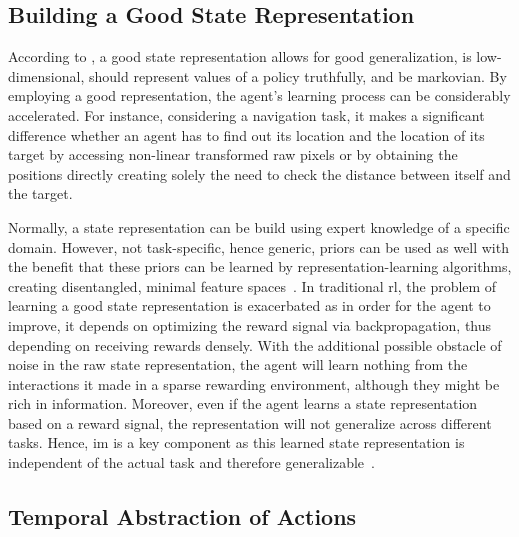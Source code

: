 \documentclass[draft,final]{vutinfth} %
\begin{document}
    \subsection{Building a Good State Representation}\label{subsec:building-a-good-state-representation}

    According to \citeauthor{bohmer_autonomous_2015}, a good state representation allows for good generalization, is low-dimensional, should represent values of a policy truthfully, and be markovian.
    By employing a good representation, the agent's learning process can be considerably accelerated.
    For instance, considering a navigation task, it makes a significant difference whether an agent has to find out its location and the location of its target by accessing non-linear transformed raw pixels or by obtaining the positions directly creating solely the need to check the distance between itself and the target.

    Normally, a state representation can be build using expert knowledge of a specific domain.
    However, not task-specific, hence generic, priors can be used as well with the benefit that these priors can be learned by representation-learning algorithms, creating disentangled, minimal feature spaces~\cite{bengio_representation_2014}.
    In traditional \gls{rl}, the problem of learning a good state representation is exacerbated as in order for the agent to improve, it depends on optimizing the reward signal via backpropagation, thus depending on receiving rewards densely.
    With the additional possible obstacle of noise in the raw state representation, the agent will learn nothing from the interactions it made in a sparse rewarding environment, although they might be rich in information.
    Moreover, even if the agent learns a state representation based on a reward signal, the representation will not generalize across different tasks.
    Hence, \gls{im} is a key component as this learned state representation is independent of the actual task and therefore generalizable~\citep{aubret_survey_2019}.

    \subsection{Temporal Abstraction of Actions}
\end{document}

